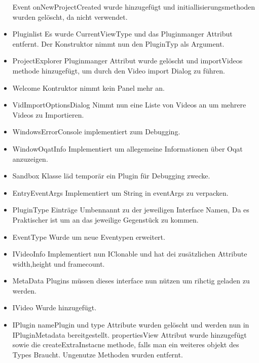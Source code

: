 \begin{itemize}
Event onNewProjectCreated wurde hinzugefügt und initiallisierungsmethoden wurden gelöscht, da nicht verwendet.
\item Pluginlist \newline
Es wurde CurrentViewType und das Pluginmanger Attribut entfernt. Der Konstruktor nimmt nun den PluginTyp als Argument.
\item ProjectExplorer \newline
Pluginmanger Attribut wurde gelöscht und importVideos methode hinzugefügt, um durch den Video import Dialog zu führen.
\item Welcome \newline
Kontruktor nimmt kein Panel mehr an.
\item VidImportOptionsDialog \newline
Nimmt nun eine Liste von Videos an um mehrere Videos zu Importieren.
\item WindowsErrorConsole \newline
implementiert zum Debugging.
\item WindowOqatInfo \newline
Implementiert um allegemeine Informationen über Oqat anzuzeigen.
\item Sandbox \newline
Klasse läd temporär ein Plugin für Debugging zwecke.
\item EntryEventArgs \newline
Implementiert um String in eventArgs zu verpacken.
\item PluginType \newline
Einträge Umbennannt zu der jeweiligen Interface Namen, Da es Praktischer ist um an das jeweilige Gegenstück zu kommen.
\item EventType \newline
Wurde um neue Eventypen erweitert.
\item IVideoInfo \newline
Implementiert nun IClonable und hat dei zusätzlichen Attribute width,height und framecount.
\item MetaData \newline
Plugins müssen dieses interface nun nützen um rihctig geladen zu werden.
\item IVideo \newline
Wurde hinzugefügt.
\item IPlugin \newline namePlugin und type Attribute wurden gelöscht und werden nun in IPluginMetadata bereitgestellt. propertiesView Attribut wurde hinzugefügt sowie die createExtraInstacne methode, falls man ein weiteres objekt des Types Braucht. Ungenutze Methoden wurden entfernt.

\end{itemize}
